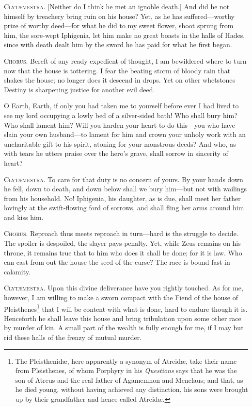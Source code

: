\documentclass[12pt]{article}
\begin{document}
\textsc{Clyt{\ae}mestra.} [Neither do I think he met an ignoble death.] And did he not himself by treachery bring ruin on his house? Yet, as he has suffered---worthy prize of worthy deed---for what he did to my sweet flower, shoot sprung from him, the sore-wept Iphigenia, let him make no great boasts in the halls of Hades, since with death dealt him by the sword he has paid for what he first began.

\textsc{Chorus.} Bereft of any ready expedient of thought, I am bewildered where to turn now that the house is tottering. I fear the beating storm of bloody rain that shakes the house; no longer does it descend in drops. Yet on other whetstones Destiny is sharpening justice for another evil deed.

O Earth, Earth, if only you had taken me to yourself before ever I had lived to see my lord occupying a lowly bed of a silver-sided bath! Who shall bury him? Who shall lament him? Will you harden your heart to do this---you who have slain your own husband---to lament for him and crown your unholy work with an uncharitable gift to his spirit, atoning for your monstrous deeds? And who, as with tears he utters praise over the hero's grave, shall sorrow in sincerity of heart?

\textsc{Clyt{\ae}mestra.} To care for that duty is no concern of yours. By your hands down he fell, down to death, and down below shall we bury him---but not with wailings from his household. No! Iphigenia, his daughter, as is due, shall meet her father lovingly at the swift-flowing ford of sorrows, and shall fling her arms around him and kiss him.

\textsc{Chorus.} Reproach thus meets reproach in turn---hard is the struggle to decide. The spoiler is despoiled, the slayer pays penalty. Yet, while Zeus remains on his throne, it remains true that to him who does it shall be done; for it is law. Who can cast from out the house the seed of the curse? The race is bound fast in calamity.

\textsc{Clyt{\ae}mestra.} Upon this divine deliverance have you rightly touched. As for me, however, I am willing to make a sworn compact with the Fiend of the house of Pleisthenes\footnote{The Pleisthenid{\ae}, here apparently a synonym of Atreid{\ae}, take their name from Pleisthenes, of whom Porphyry in his \textit{Questions} says that he was the son of Atreus and the real father of Agamemnon and Menelaus; and that, as he died young, without having achieved any distinction, his sons were brought up by their grandfather and hence called Atreid{\ae}.} that I will be content with what is done, hard to endure though it is. Henceforth he shall leave this house and bring tribulation upon some other race by murder of kin. A small part of the wealth is fully enough for me, if I may but rid these halls of the frenzy of mutual murder.
\end{document}
